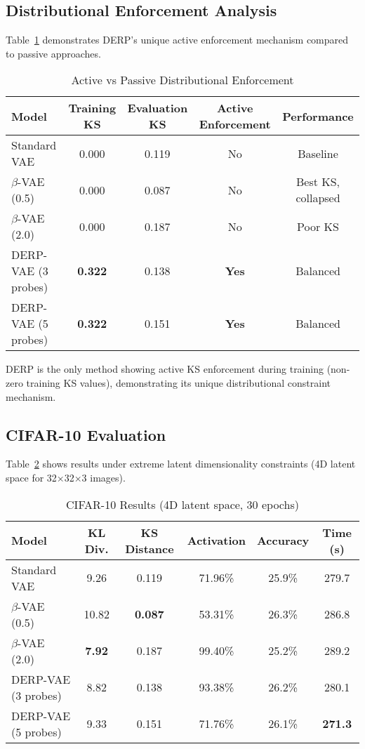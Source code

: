 \documentclass[11pt]{article}
\begin{document}
\subsection{Distributional Enforcement Analysis}

Table~\ref{tab:enforcement_comparison} demonstrates DERP's unique active enforcement mechanism compared to passive approaches.

\begin{table}[ht]
\centering
\caption{Active vs Passive Distributional Enforcement}
\label{tab:enforcement_comparison}
\begin{tabular}{@{}lcccc@{}}
\toprule
\textbf{Model} & \textbf{Training KS} & \textbf{Evaluation KS} & \textbf{Active Enforcement} & \textbf{Performance} \\
\midrule
Standard VAE & 0.000 & 0.119 & No & Baseline \\
$\beta$-VAE (0.5) & 0.000 & 0.087 & No & Best KS, collapsed \\
$\beta$-VAE (2.0) & 0.000 & 0.187 & No & Poor KS \\
DERP-VAE (3 probes) & \textbf{0.322} & 0.138 & \textbf{Yes} & Balanced \\
DERP-VAE (5 probes) & \textbf{0.322} & 0.151 & \textbf{Yes} & Balanced \\
\bottomrule
\end{tabular}
\end{table}

DERP is the only method showing active KS enforcement during training (non-zero training KS values), demonstrating its unique distributional constraint mechanism.

\subsection{CIFAR-10 Evaluation}

Table~\ref{tab:cifar_results} shows results under extreme latent dimensionality constraints (4D latent space for 32×32×3 images).

\begin{table}[ht]
\centering
\caption{CIFAR-10 Results (4D latent space, 30 epochs)}
\label{tab:cifar_results}
\begin{tabular}{@{}lccccc@{}}
\toprule
\textbf{Model} & \textbf{KL Div.} & \textbf{KS Distance} & \textbf{Activation} & \textbf{Accuracy} & \textbf{Time (s)} \\
\midrule
Standard VAE & 9.26 & 0.119 & 71.96\% & 25.9\% & 279.7 \\
$\beta$-VAE (0.5) & 10.82 & \textbf{0.087} & 53.31\% & 26.3\% & 286.8 \\
$\beta$-VAE (2.0) & \textbf{7.92} & 0.187 & 99.40\% & 25.2\% & 289.2 \\
DERP-VAE (3 probes) & 8.82 & 0.138 & 93.38\% & 26.2\% & 280.1 \\
DERP-VAE (5 probes) & 9.33 & 0.151 & 71.76\% & 26.1\% & \textbf{271.3} \\
\bottomrule
\end{tabular}
\end{table}
\end{document}
